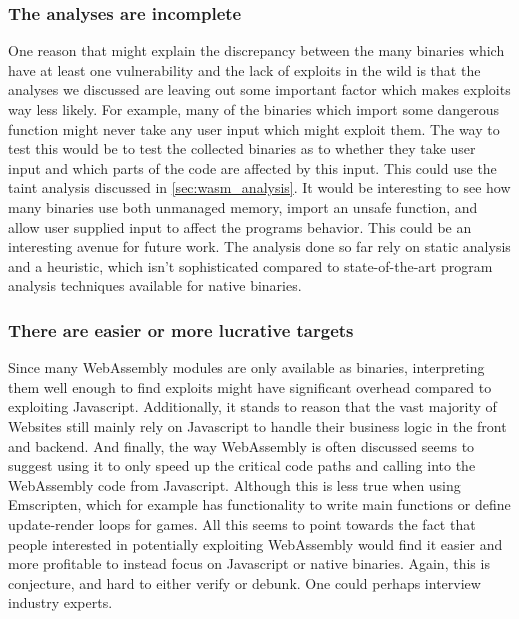 \documentclass[sigconf]{acmart}
\begin{document}
\subsubsection{The analyses are incomplete}
\label{sec:analyses_incomplete}
One reason that might explain the discrepancy between the many binaries which have at least one vulnerability  and the lack of exploits in the wild is that the analyses we discussed are leaving out some important factor which makes exploits way less likely. For example, many of the binaries which import some dangerous function might never take any user input which might exploit them. The way to test this would be to test the collected binaries as to whether they take user input and which parts of the code are affected by this input. This could use the taint analysis discussed in \ref{sec:wasm_analysis}. It would be interesting to see how many binaries use both unmanaged memory, import an unsafe function, and allow user supplied input to affect the programs behavior. This could be an interesting avenue for future work. The analysis done so far rely on static analysis and a heuristic, which isn't sophisticated compared to state-of-the-art program analysis techniques available for native binaries.

\subsubsection{There are easier or more lucrative targets}
\label{sec:better_targets}
Since many WebAssembly modules are only available as binaries, interpreting them well enough to find exploits might have significant overhead compared to exploiting Javascript. Additionally, it stands to reason that the vast majority of Websites still mainly rely on Javascript to handle their business logic in the front and backend. And finally, the way WebAssembly is often discussed seems to suggest using it to only speed up the critical code paths and calling into the WebAssembly code from Javascript. Although this is less true when using Emscripten, which for example has functionality to write main functions or define update-render loops for games. All this seems to point towards the fact that people interested in potentially exploiting WebAssembly would find it easier and more profitable to instead focus on Javascript or native binaries. Again, this is conjecture, and hard to either verify or debunk. One could perhaps interview industry experts.
\end{document}
